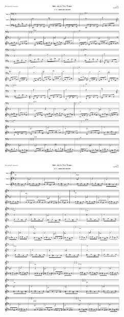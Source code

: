 \begin{figure}[H]                                             
{                                                             
  \setlength{\tabcolsep}{3.0pt}                               
  \setlength\cmidrulewidth{\heavyrulewidth} %
    \begin{subfigure}{0.5\textwidth}                            
  \includegraphics[width=6cm]{music/title_no_17_page_1001.png}%
    \end{subfigure}                                             
  \begin{subfigure}{0.5\textwidth}                            
  \includegraphics[width=6cm]{music/title_no_18_page_1001.png}%
    \end{subfigure}                                             
}                                                             
\end{figure}                                                  


